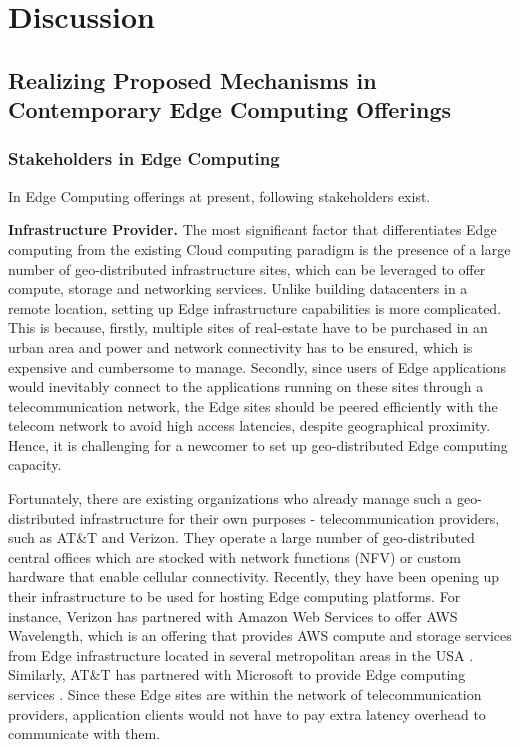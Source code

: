\chapter{Discussion}
\label{sec:discussion}

\section{Realizing Proposed Mechanisms in Contemporary Edge Computing Offerings}
\subsection{Stakeholders in Edge Computing}
In Edge Computing offerings at present, following stakeholders exist.
\par \noindent \textbf{Infrastructure Provider.} The most significant factor that differentiates Edge computing from the existing Cloud computing paradigm is the presence of a large number of geo-distributed infrastructure sites, which can be leveraged to offer compute, storage and networking services. Unlike building datacenters in a remote location, setting up Edge infrastructure capabilities is more complicated. This is because, firstly, multiple sites of real-estate have to be purchased in an urban area and power and network connectivity has to be ensured, which is expensive and cumbersome to manage. Secondly, since users of Edge applications would inevitably connect to the applications running on these sites through a telecommunication network, the Edge sites should be peered efficiently with the telecom network to avoid high access latencies, despite geographical proximity. Hence, it is challenging for a newcomer to set up geo-distributed Edge computing capacity.
\par Fortunately, there are existing organizations who already manage such a geo-distributed infrastructure for their own purposes - telecommunication providers, such as AT\&T and Verizon. They operate a large number of geo-distributed central offices which are stocked with network functions (NFV) or custom hardware that enable cellular connectivity. Recently, they have been opening up their infrastructure to be used for hosting Edge computing platforms. For instance, Verizon has partnered with Amazon Web Services to offer AWS Wavelength, which is an offering that provides AWS compute and storage services from Edge infrastructure located in several metropolitan areas in the USA \cite{aws_wavelength}. Similarly, AT\&T has partnered with Microsoft to provide Edge computing services \cite{att_microsoft}. Since these Edge sites are within the network of telecommunication providers, application clients would not have to pay extra latency overhead to communicate with them.
